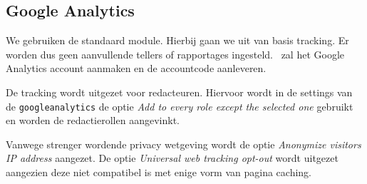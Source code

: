 \subsection{Google Analytics}\label{analytics}

We gebruiken de standaard  module. Hierbij gaan we uit van basis tracking. Er worden dus geen aanvullende tellers of rapportages ingesteld. \thecustomer \ zal het Google Analytics account aanmaken en de accountcode aanleveren.

De tracking wordt uitgezet voor redacteuren. Hiervoor wordt in de settings van de \texttt{googleanalytics} de optie \emph{Add to every role except the selected one} gebruikt en worden de redactierollen aangevinkt.

Vanwege strenger wordende privacy wetgeving wordt de optie \emph{Anonymize visitors IP address} aangezet. De optie \emph{Universal web tracking opt-out} wordt uitgezet aangezien deze niet compatibel is met enige vorm van pagina caching.
